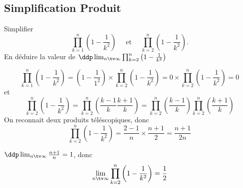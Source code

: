 \subsection{Simplification Produit}

\begin{exercice}
Simplifier  
$$\prod_{k=1}^n \left(1-\frac{1}{k^2}\right) \quad \text{ et } \quad \prod_{k=2}^n \left(1-\frac{1}{k^2}\right).$$
En déduire la valeur de $\ddp \lim_{n\tv \infty} \prod_{k=2}^n \left(1-\frac{1}{k^2}\right)$
\end{exercice}




\begin{correction}
$$\prod_{k=1}^n \left(1-\frac{1}{k^2}\right) = \left(1-\frac{1}{1^2}\right) \times \prod_{k=2}^n \left(1-\frac{1}{k^2}\right) =0 \times \prod_{k=2}^n \left(1-\frac{1}{k^2}\right) =0$$
et
$$\prod_{k=2}^n \left(1-\frac{1}{k^2}\right) =\prod_{k=2}^n\left( \frac{k-1}{k}\frac{k+1}{k}\right) = \prod_{k=2}^n\left( \frac{k-1}{k}\right) \prod_{k=2}^n\left(  \frac{k+1}{k}\right) $$ 
On reconnait deux produits téléscopiques, donc 
$$\prod_{k=2}^n \left(1-\frac{1}{k^2}\right)  = \frac{2-1}{n} \times \frac{n+1}{2} =\frac{n+1}{2n}$$

$\ddp \lim_{n\tv \infty} \frac{n+1}{n}=1$, donc 
$$\lim_{n\tv \infty} \prod_{k=2}^n \left(1-\frac{1}{k^2}\right)  =\frac{1}{2}$$

\end{correction}